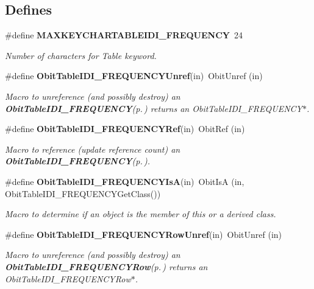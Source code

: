 \subsection*{Defines}
\begin{CompactItemize}
\item 
\#define {\bf MAXKEYCHARTABLEIDI\_\-FREQUENCY}\ 24
\begin{CompactList}\small\item\em Number of characters for Table keyword. \item\end{CompactList}\item 
\#define {\bf Obit\-Table\-IDI\_\-FREQUENCYUnref}(in)\ Obit\-Unref (in)
\begin{CompactList}\small\item\em Macro to unreference (and possibly destroy) an {\bf Obit\-Table\-IDI\_\-FREQUENCY}{\rm (p.\,\pageref{structObitTableIDI__FREQUENCY})} returns an Obit\-Table\-IDI\_\-FREQUENCY$\ast$. \item\end{CompactList}\item 
\#define {\bf Obit\-Table\-IDI\_\-FREQUENCYRef}(in)\ Obit\-Ref (in)
\begin{CompactList}\small\item\em Macro to reference (update reference count) an {\bf Obit\-Table\-IDI\_\-FREQUENCY}{\rm (p.\,\pageref{structObitTableIDI__FREQUENCY})}. \item\end{CompactList}\item 
\#define {\bf Obit\-Table\-IDI\_\-FREQUENCYIs\-A}(in)\ Obit\-Is\-A (in, Obit\-Table\-IDI\_\-FREQUENCYGet\-Class())
\begin{CompactList}\small\item\em Macro to determine if an object is the member of this or a derived class. \item\end{CompactList}\item 
\#define {\bf Obit\-Table\-IDI\_\-FREQUENCYRow\-Unref}(in)\ Obit\-Unref (in)
\begin{CompactList}\small\item\em Macro to unreference (and possibly destroy) an {\bf Obit\-Table\-IDI\_\-FREQUENCYRow}{\rm (p.\,\pageref{structObitTableIDI__FREQUENCYRow})} returns an Obit\-Table\-IDI\_\-FREQUENCYRow$\ast$. \item\end{CompactList}\item 

\end{CompactItemize}
